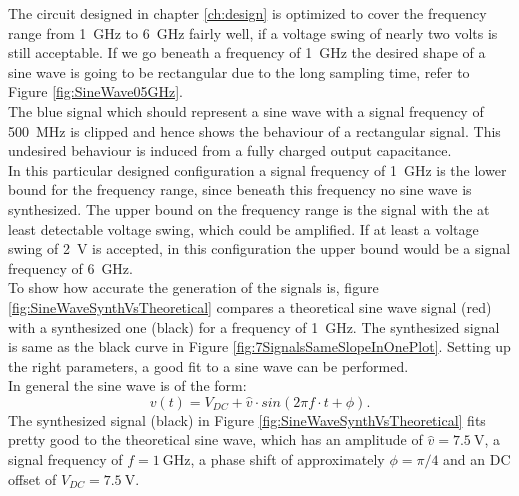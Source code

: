 The circuit designed in chapter \ref{ch:design} is optimized to cover the frequency range from \SI{1}{\GHz} to \SI{6}{\GHz} fairly well, if a voltage swing of nearly  two volts is still acceptable.
If we go beneath a frequency of \SI{1}{\GHz} the desired shape of a sine wave is going to be rectangular due to the long sampling time, refer to Figure \ref{fig:SineWave05GHz}.\\
The blue signal which should represent a sine wave with a signal frequency of \SI{500}{\MHz} is clipped and hence shows the behaviour of a rectangular signal.
 This undesired behaviour is induced from a fully charged output capacitance.\\
 In this particular designed configuration a signal frequency of \SI{1}{\giga \hertz} is the lower bound for the frequency range, since beneath this frequency no sine wave is synthesized.
The upper bound on the frequency range is the signal with the at least detectable voltage swing, which could be amplified.
If at least a voltage swing of \SI{2}{\volt} is accepted, in this configuration the upper bound would be a signal frequency of \SI{6}{\GHz}.\\

To show how accurate the generation of the signals is, figure \ref{fig:SineWaveSynthVsTheoretical} compares a theoretical sine wave signal (red) with a synthesized one (black) for a frequency of \SI{1}{\GHz}.
The synthesized signal is same as the black curve in Figure \ref{fig:7SignalsSameSlopeInOnePlot}.
Setting up the right parameters, a good fit to a sine wave can be performed.\\
In general the sine wave is of the form: 
\begin{equation}
	v(t)= V_{DC} + \widehat{v} \cdot sin( 2  \pi  f \cdot  t + \phi).
\end{equation}
The synthesized signal (black) in Figure \ref{fig:SineWaveSynthVsTheoretical} fits pretty good to the theoretical sine wave, which has an amplitude of $\widehat{v} = \SI{7.5}{\volt}$, a signal frequency of $f = \SI{1}{\giga \hertz}$, a phase shift of approximately $\phi = \pi / 4$ and an DC offset of $V_{DC} = \SI{7.5}{\volt}$.

